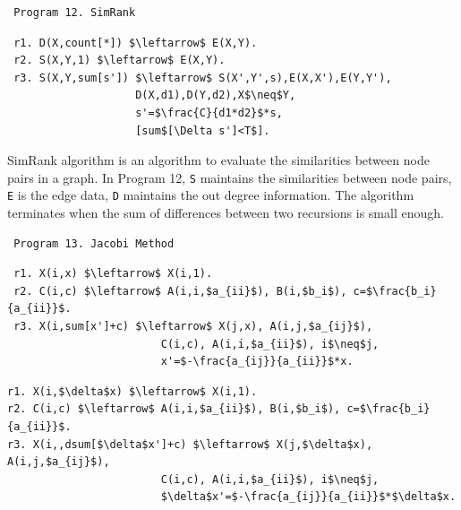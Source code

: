 \begin{appendix}
 \begin{verbatim}
 Program 12. SimRank
 \end{verbatim}\small
 \begin{lstlisting}
 r1. D(X,count[*]) $\leftarrow$ E(X,Y).
 r2. S(X,Y,1) $\leftarrow$ E(X,Y).
 r3. S(X,Y,sum[s']) $\leftarrow$ S(X',Y',s),E(X,X'),E(Y,Y'),
                    D(X,d1),D(Y,d2),X$\neq$Y,
                    s'=$\frac{C}{d1*d2}$*s,
                    [sum$[\Delta s']<T$].
 \end{lstlisting}
 \normalsize
 
 SimRank algorithm \cite{Jeh:2002:SMS:775047.775126} is an algorithm to evaluate the similarities between node pairs in a graph. In Program 12, \texttt{S} maintains the similarities between node pairs, \texttt{E} is the edge data, \texttt{D} maintains the out degree information. The algorithm terminates when the sum of differences between two recursions is small enough.
 
 \begin{verbatim}
 Program 13. Jacobi Method
 \end{verbatim}\small
 \begin{lstlisting}
 r1. X(i,x) $\leftarrow$ X(i,1).
 r2. C(i,c) $\leftarrow$ A(i,i,$a_{ii}$), B(i,$b_i$), c=$\frac{b_i}{a_{ii}}$.
 r3. X(i,sum[x']+c) $\leftarrow$ X(j,x), A(i,j,$a_{ij}$),
                        C(i,c), A(i,i,$a_{ii}$), i$\neq$j,
                        x'=$-\frac{a_{ij}}{a_{ii}}$*x.
 \end{lstlisting}
\begin{lstlisting}
r1. X(i,$\delta$x) $\leftarrow$ X(i,1).
r2. C(i,c) $\leftarrow$ A(i,i,$a_{ii}$), B(i,$b_i$), c=$\frac{b_i}{a_{ii}}$.
r3. X(i,,dsum[$\delta$x']+c) $\leftarrow$ X(j,$\delta$x), A(i,j,$a_{ij}$),
                        C(i,c), A(i,i,$a_{ii}$), i$\neq$j,
                        $\delta$x'=$-\frac{a_{ij}}{a_{ii}}$*$\delta$x.

 \end{lstlisting}

 \normalsize
 

\end{appendix}
